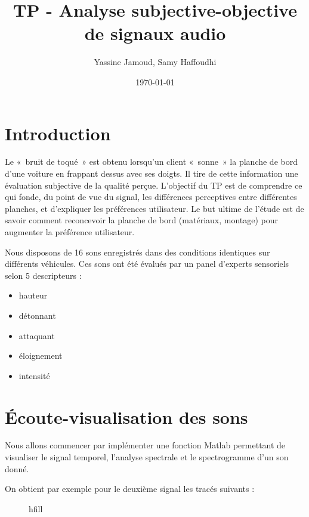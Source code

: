 \documentclass[12pt,a4paper,titlepage]{article}
\title{TP - Analyse subjective-objective de signaux audio}
\author{Yassine Jamoud, Samy Haffoudhi}
\date{\today}
\begin{document}
\maketitle

\section*{Introduction}

Le « bruit de toqué » est obtenu lorsqu’un client « sonne » la planche de bord d’une voiture en frappant dessus avec ses doigts. Il tire de cette information une évaluation subjective de la qualité perçue. L’objectif du TP est de comprendre ce qui fonde, du point de vue du signal, les différences perceptives entre différentes planches, et d’expliquer les préférences utilisateur. Le but ultime de l’étude est de savoir comment reconcevoir la planche de bord (matériaux, montage) pour augmenter la préférence utilisateur.

Nous disposons de 16 sons enregistrés dans des conditions
identiques sur différents véhicules. Ces sons ont été évalués
par un panel d'experts sensoriels selon 5 descripteurs :
\begin{itemize}
    \item{hauteur}
    \item{détonnant}
    \item{attaquant}
    \item{éloignement}
    \item{intensité}
\end{itemize}

\section{Écoute-visualisation des sons}

Nous allons commencer par implémenter une fonction Matlab
permettant de visualiser le signal temporel,
l'analyse spectrale et le spectrogramme d'un son donné.

On obtient par exemple pour le deuxième signal les tracés suivants :

\begin{figure}[H]
 \hfill
 hfill
\caption{}
\end{figure}
\end{document}
